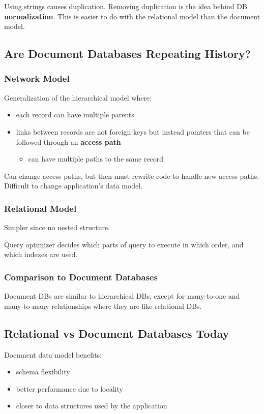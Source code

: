\documentclass[11pt]{article}
\begin{document}
Using strings causes duplication.
Removing duplication is the idea behind DB \textbf{normalization}.
This is easier to do with the relational model than the document model.
\subsection{Are Document Databases Repeating History?}
\label{sec:org023369d}
\subsubsection{Network Model}
\label{sec:org69ec1ec}
Generalization of the hierarchical model where:
\begin{itemize}
\item each record can have multiple parents
\item links between records are not foreign keys but instead
pointers that can be followed through an \textbf{access path}
\begin{itemize}
\item can have multiple paths to the same record
\end{itemize}
\end{itemize}

Can change access paths, but then must rewrite code to handle
new access paths.
Difficult to change application's data model.
\subsubsection{Relational Model}
\label{sec:orgf8d31bb}
Simpler since no nested structure.

Query optimizer decides which parts of query to execute in which
order, and which indexes are used.
\subsubsection{Comparison to Document Databases}
\label{sec:org802c479}
Document DBs are similar to hierarchical DBs, except for many-to-one
and many-to-many relationships where they are like relational DBs.
\subsection{Relational vs Document Databases Today}
\label{sec:orged2a7cf}
Document data model benefits:
\begin{itemize}
\item schema flexibility
\item better performance due to locality
\item closer to data structures used by the application
\end{itemize}
\end{document}
